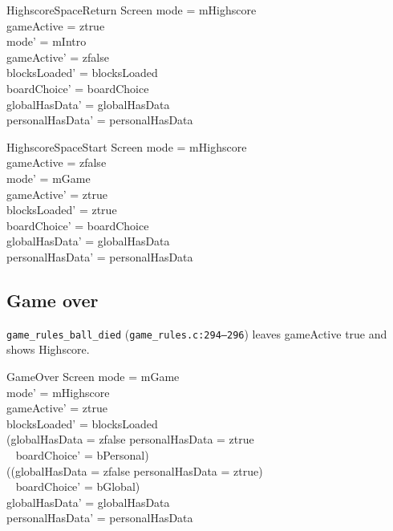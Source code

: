 \documentclass[a4paper,10pt,fleqn]{article}
\begin{document}
\begin{schema}{HighscoreSpaceReturn}
  \Delta Screen
  \where
  mode = mHighscore \\
  gameActive = ztrue \\
  mode' = mIntro \\
  gameActive' = zfalse \\
  blocksLoaded' = blocksLoaded \\
  boardChoice' = boardChoice \\
  globalHasData' = globalHasData \\
  personalHasData' = personalHasData
\end{schema}

\begin{schema}{HighscoreSpaceStart}
  \Delta Screen
  \where
  mode = mHighscore \\
  gameActive = zfalse \\
  mode' = mGame \\
  gameActive' = ztrue \\
  blocksLoaded' = ztrue \\
  boardChoice' = boardChoice \\
  globalHasData' = globalHasData \\
  personalHasData' = personalHasData
\end{schema}

\subsection{Game over}

\texttt{game\_rules\_ball\_died} (\texttt{game\_rules.c:294--296})
leaves \textsf{gameActive} true and shows \textsf{Highscore}.

\begin{schema}{GameOver}
  \Delta Screen
  \where
  mode = mGame \\
  mode' = mHighscore \\
  gameActive' = ztrue \\
  blocksLoaded' = blocksLoaded \\
  (globalHasData = zfalse \land personalHasData = ztrue \\
  \quad~ \implies boardChoice' = bPersonal) \\
  (\lnot (globalHasData = zfalse \land personalHasData = ztrue) \\
  \quad~ \implies boardChoice' = bGlobal) \\
  globalHasData' = globalHasData \\
  personalHasData' = personalHasData
\end{schema}
\end{document}
